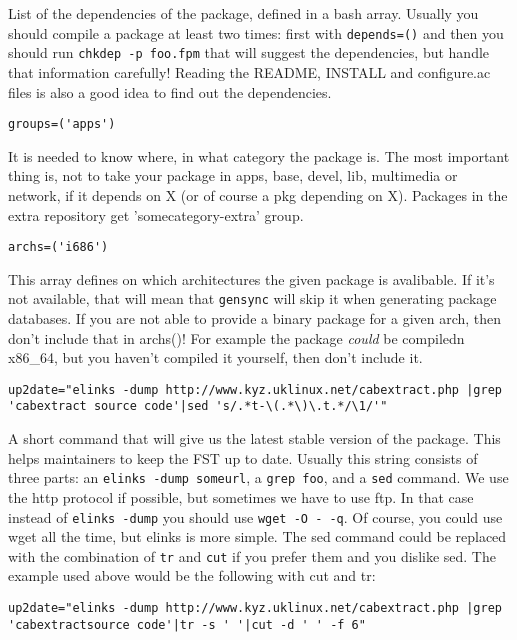 List of the dependencies of the package, defined in a bash array. Usually you
should compile a package at least two times: first with {\tt depends=()} and
then you should run {\tt chkdep -p foo.fpm} that will suggest the dependencies,
but handle that information carefully! Reading the README, INSTALL and
configure.ac files is also a good idea to find out the dependencies.

\begin{verbatim}
groups=('apps')
\end{verbatim}

It is needed to know where, in what category the package is. The most important
thing is, not to take your package in apps, base, devel, lib, multimedia or
network, if it depends on X (or of course a pkg depending on X).
Packages in the extra repository get 'somecategory-extra' group.

\begin{verbatim}
archs=('i686')
\end{verbatim}

This array defines on which architectures the given package is avalibable.
If it's not available, that will mean that {\tt gensync} will skip it
when generating package databases. If you are not able to provide a binary
package for a given arch, then don't include that in archs()! For example the
package \textit{could} be compiledn x86\_64, but you haven't compiled it
yourself, then don't include it.

\begin{verbatim}
up2date="elinks -dump http://www.kyz.uklinux.net/cabextract.php |grep 'cabextract source code'|sed 's/.*t-\(.*\)\.t.*/\1/'"
\end{verbatim}

A short command that will give us the latest stable version of the package. This helps maintainers to keep the FST up to date. Usually this string consists of three parts: an {\tt elinks -dump someurl}, a {\tt grep foo}, and a {\tt sed} command. We use the http protocol if possible, but sometimes we have to use ftp. In that case instead of {\tt elinks -dump} you should use {\tt wget -O - -q}. Of course, you could use wget all the time, but elinks is more simple. The sed command could be replaced with the combination of {\tt tr} and {\tt cut} if you prefer them and you dislike sed. The example used above would be the following with cut and tr:

\begin{verbatim}
up2date="elinks -dump http://www.kyz.uklinux.net/cabextract.php |grep 'cabextractsource code'|tr -s ' '|cut -d ' ' -f 6"
\end{verbatim}

